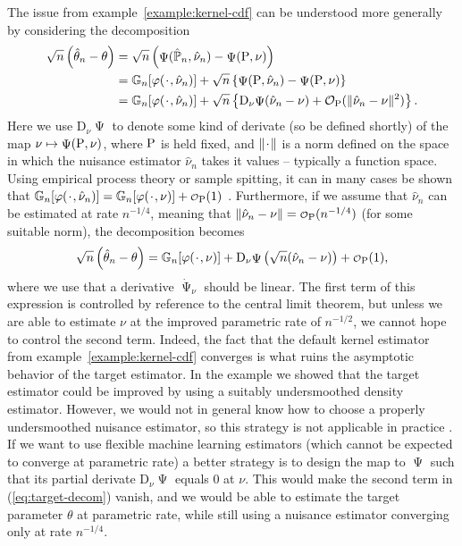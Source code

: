 \documentclass[a4,danish]{article}
\DeclareMathOperator{\TT}{\Psi}
\begin{document}
The issue from example~\ref{example:kernel-cdf} can be understood more generally by considering the
decomposition
\begin{align*}
  \sqrt{n}
  \left(
  \hat{\theta}_n - \theta
  \right)
  & =  \sqrt{n}
    \left(
    \TT(\empmeas,\hat{\nu}_n) - \TT(\P,\nu)
    \right) \\
  & =
    \G{\phi( \blank, \hat{\nu}_n)}
    + \sqrt{n}
    \left\{
    \TT(\P,\hat{\nu}_n) - \TT(\P,\nu)
    \right\}
  \\
  & = \G{\phi( \blank, \hat{\nu}_n)}
    + \sqrt{n}
    \left\{
    \mathrm{D}_{\nu}{\TT}(\hat{\nu}_n - \nu)
    + \mathcal{O}_{\P}(\Vert \hat{\nu}_n - \nu \Vert^2)
    \right\}.
\end{align*}
Here we use $\mathrm{D}_{\nu}{\TT}$ to denote some kind of derivate (so be defined shortly) of the
map $\nu \mapsto \TT(\P, \nu)$, where $\P$ is held fixed, and $\Vert \blank \Vert$ is a norm defined
on the space in which the nuisance estimator $\hat{\nu}_n$ takes it values -- typically a function
space. Using empirical process theory or sample spitting, it can in many cases be shown that
$\G{\phi( \blank, \hat{\nu}_n)} = \G{\phi( \blank, \nu)} + \smallO_{\P}(1)$
\citep{van1996weak,van2000asymptotic,chernozhukov2018double}. Furthermore, if we assume that
$\hat{\nu}_n$ can be estimated at rate $n^{-1/4}$, meaning that
$\Vert \hat{\nu}_n - \nu \Vert = \smallO_{\P}(n^{-1/4})$ (for some suitable norm), the decomposition
becomes
\begin{equation}
  \label{eq:target-decom}
  \sqrt{n}
  \left(
    \hat{\theta}_n - \theta
  \right)
  = \G{\phi( \blank, \nu)}
  + \mathrm{D}_{\nu}{\TT}
  \left(
    \sqrt{n}(\hat{\nu}_n - \nu)
  \right)
  + \smallO_{\P}(1),
\end{equation}
where we use that a derivative $\dot{\TT}_{\nu}$ should be linear. The first term of this expression
is controlled by reference to the central limit theorem, but unless we are able to estimate $\nu$ at
the improved parametric rate of $n^{-1/2}$, we cannot hope to control the second term. Indeed, the
fact that the default kernel estimator from example~\ref{example:kernel-cdf} converges
 is what ruins the asymptotic behavior of the target estimator.
In the example we showed that the target estimator could be improved by using a suitably
undersmoothed density estimator. However, we would not in general know how to choose a properly
undersmoothed nuisance estimator, so this strategy is not applicable in practice . If we want to use flexible machine learning estimators
(which cannot be expected to converge at parametric rate) a better strategy is to design the map to
$\TT$ such that its partial derivate $\mathrm{D}_{\nu}{\TT}$ equals 0 at $\nu$. This would make the
second term in (\ref{eq:target-decom}) vanish, and we would be able to estimate the target parameter
$\theta$ at parametric rate, while still using a nuisance estimator converging only at rate
$n^{-1/4}$.
\end{document}
